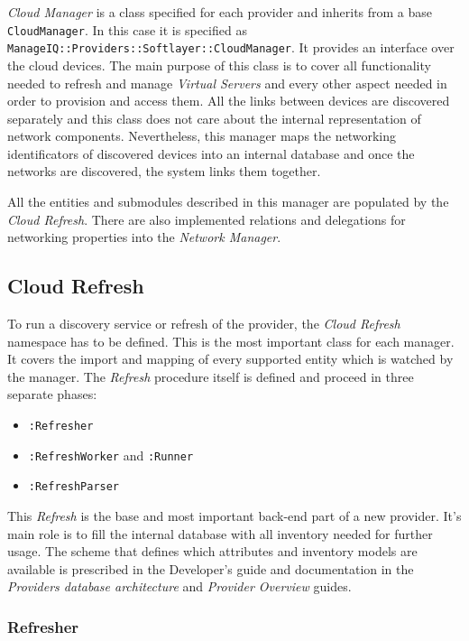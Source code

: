 \emph{Cloud Manager} is a class specified for each provider and inherits from a base \verb|CloudManager|. In this case it is specified as \verb|ManageIQ::Providers::Softlayer::CloudManager|. It provides an interface over the cloud devices. The main purpose of this class is to cover all functionality needed to refresh and manage \emph{Virtual Servers} and every other aspect needed in order to provision and access them. All the links between devices are discovered separately and this class does not care about the internal representation of network components. Nevertheless, this manager maps the networking identificators of discovered devices into an internal database and once the networks are discovered, the system links them together.

All the entities and submodules described in this manager are populated by the \emph{Cloud Refresh}. There are also implemented relations and delegations for networking properties into the \emph{Network Manager}.

\clearpage
\subsection{Cloud Refresh}
\label{sub:Cloud Refresh}

To run a discovery service or refresh of the provider, the \emph{Cloud Refresh} namespace has to be defined. This is the most important class for each manager. It covers the import and mapping of every supported entity which is watched by the manager. The \emph{Refresh} procedure itself is defined and proceed in three separate phases:

\begin{itemize}
	\item \verb|:Refresher|
	\item \verb|:RefreshWorker| and \verb|:Runner|
	\item \verb|:RefreshParser|
\end{itemize}

This \emph{Refresh} is the base and most important back-end part of a new provider. It's main role is to fill the internal database with all inventory needed for further usage. The scheme that defines which attributes and inventory models are available is prescribed in the Developer's guide and documentation\cite{manageiq_dev} in the \emph{Providers database architecture} and \emph{Provider Overview} guides.

\subsubsection{Refresher}
\label{subs:Refresher}


